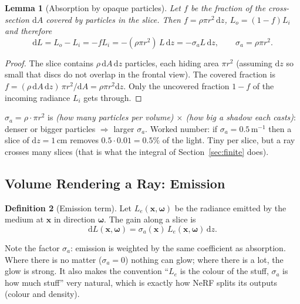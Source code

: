 \documentclass[11pt,a4paper]{article}
\newcommand{\x}{{\bm{x}}}
\newcommand{\w}{{\bm{\omega}}}
\theoremstyle{definition}
\newtheorem{definition}{Definition}[section]
\theoremstyle{plain}
\newtheorem{lemma}[definition]{Lemma}
\theoremstyle{remark}
\begin{document}
\begin{lemma}[Absorption by opaque particles]\label{lem:particles}
Let $f$ be the fraction of the cross-section $\mathrm dA$ covered by particles in the slice. Then $f=\rho\pi r^2\,\mathrm dz$, $L_o=(1-f)L_i$ and therefore
\[
\mathrm dL=L_o-L_i=-fL_i=-(\rho\pi r^2)\,L\,\mathrm dz=-\sigma_aL\,\mathrm dz,\qquad \sigma_a=\rho\pi r^2 .
\]
\end{lemma}
\begin{proof}
The slice contains $\rho\,\mathrm dA\,\mathrm dz$ particles, each hiding area $\pi r^2$ (assuming $\mathrm dz$ so small that discs do not overlap in the frontal view). The covered fraction is $f=(\rho\,\mathrm dA\,\mathrm dz)\,\pi r^2/\mathrm dA=\rho\pi r^2\mathrm dz$. Only the uncovered fraction $1-f$ of the incoming radiance $L_i$ gets through.
\end{proof}

\begin{intuition}
$\sigma_a=\rho\cdot\pi r^2$ is \emph{(how many particles per volume) $\times$ (how big a shadow each casts)}: denser or bigger particles $\Rightarrow$ larger $\sigma_a$. Worked number: if $\sigma_a=0.5\,\mathrm{m^{-1}}$ then a slice of $\mathrm dz=1\,\mathrm{cm}$ removes $0.5\cdot0.01=0.5\%$ of the light. Tiny per slice, but a ray crosses many slices (that is what the integral of Section~\ref{sec:finite} does).
\end{intuition}

\subsection{Volume Rendering a Ray: Emission}

\begin{definition}[Emission term]\label{def:emission}
Let $L_e(\x,\w)$ be the radiance emitted by the medium at $\x$ in direction $\w$. The gain along a slice is
\[
\mathrm dL(\x,\w)=\sigma_a(\x)\,L_e(\x,\w)\,\mathrm dz .
\]
\end{definition}

\begin{intuition}
Note the factor $\sigma_a$: emission is weighted by the same coefficient as absorption. Where there is no matter ($\sigma_a=0$) nothing can glow; where there is a lot, the glow is strong. It also makes the convention ``$L_e$ is the colour of the stuff, $\sigma_a$ is how much stuff'' very natural, which is exactly how NeRF splits its outputs (colour and density).
\end{intuition}
\end{document}
